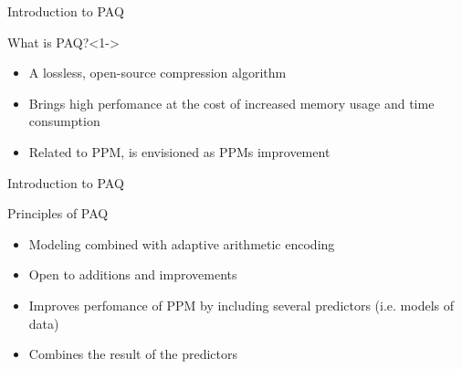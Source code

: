 \documentclass[11pt,usenames,dvipsnames]{beamer}
\begin{document}
\begin{frame}{Introduction to PAQ}

	
	\begin{alertblock}{What is PAQ?}<1->
		\begin{itemize}
			\item A lossless, open-source compression algorithm
			\item Brings high perfomance at the cost of increased memory usage and time consumption
			\item Related to PPM, is envisioned as PPMs improvement
		\end{itemize}
	\end{alertblock}
	
\end{frame}




\begin{frame}{Introduction to PAQ}
	\begin{exampleblock}{Principles of PAQ}
	
		\begin{itemize}
			\item Modeling combined with adaptive arithmetic encoding
			\item Open to additions and improvements
			\item Improves perfomance of PPM by including several predictors (i.e. models of data) 
			\item Combines the result of the predictors
		\end{itemize}
	\end{exampleblock}

\end{frame}
\end{document}
